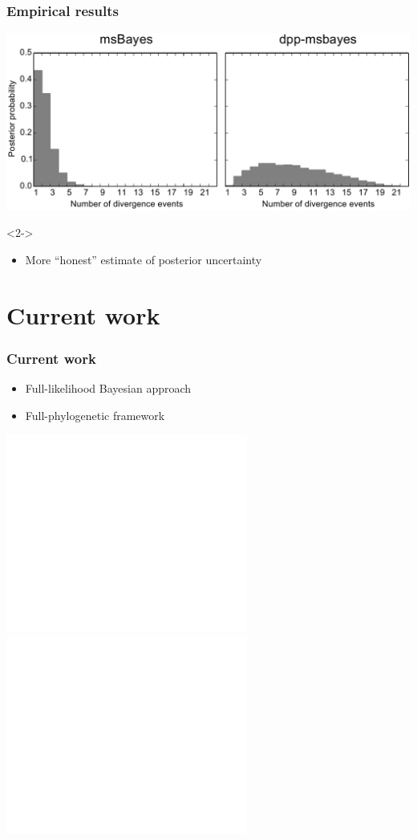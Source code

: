 \begin{frame}
    \frametitle{Empirical results}
    \centerline{
    \includegraphics[width=\textwidth]{../../empirical-analyses/plots/philippines-dpp-psi-posterior-old-vs-dpp.pdf}}

    \begin{uncoverenv}<2->
    \begin{itemize}
        \item More ``honest'' estimate of posterior uncertainty
    \end{itemize}
    \end{uncoverenv}
\end{frame}


\section{Current work}

\begin{frame}[t]
    \frametitle{Current work}
    
    \vspace{-3mm}

    \begin{minipage}[c][0.2\textheight][c]{\linewidth}
    \begin{itemize}
        \item<1-> Full-likelihood Bayesian approach
        \item<2-> Full-phylogenetic framework
    \end{itemize}
    \end{minipage}

    \vspace{-5mm}
    
    \begin{center}
        \includegraphics<3>[height=6.5cm]{../images/dmc-cartoon-no-islands-pop-shared-middle-wide.pdf}
        \includegraphics<4>[height=6.5cm]{../images/dmc-cartoon-no-islands-pop-phylogeny.pdf}
    \end{center}
\end{frame}


